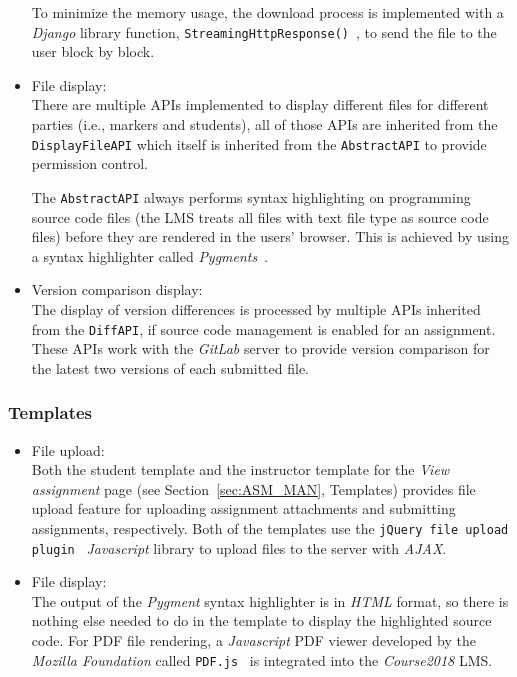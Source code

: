 \begin{itemize}
    To minimize the memory usage, the download process is implemented with
    a \emph{Django} library function,
    \texttt{StreamingHttpResponse()}~\citep[Section Streaming\-Http\-Response
    objects]{DdjangoRequest},
    to send the file to the user block by block.

    \item File display: \\
    There are multiple APIs implemented to display different files for different
    parties
    (i.e., markers and students), all of those APIs are inherited from the
    \texttt{DisplayFileAPI} which itself is inherited from the
    \texttt{AbstractAPI} to provide permission control.

    The \texttt{AbstractAPI} always performs
    syntax highlighting on programming source code files
    (the LMS treats all files with text file type as source code files)
    before they are rendered in the users' browser.
    This is achieved by
    using a syntax highlighter called \emph{Pygments}~\cite{Bpygments}.

    \item Version comparison display: \\
    The display of version differences is processed by multiple APIs inherited
    from the \texttt{Diff\-API}, if source code management is enabled for an
    assignment. These APIs work with the \emph{GitLab} server to provide version
    comparison for the latest two versions of each submitted file.
\end{itemize}

\subsubsection{Templates}
\begin{itemize}
    \item File upload: \\
        Both the student template and the instructor template for the
        \emph{View assignment} page (see Section~\ref{sec:ASM_MAN}, Templates)
        provides file upload feature for uploading
        assignment attachments and submitting assignments, respectively.
        Both of the templates use the
        \texttt{jQuery file upload plugin}~\citep[Section Description]{jqFileUpload}
        \emph{Javascript} library to upload files to the server with
        \emph{AJAX}.
    \item File display: \\
        The output of the \emph{Pygment} syntax highlighter is in \emph{HTML}
        format, so there is nothing else needed to do in the template to
        display the highlighted source code.
        For PDF file rendering, a \emph{Javascript} PDF viewer developed
        by the \emph{Mozilla Foundation} called \texttt{PDF.js}~\cite{pdfjs}
        is integrated into the \emph{Course2018} LMS.
\end{itemize}

